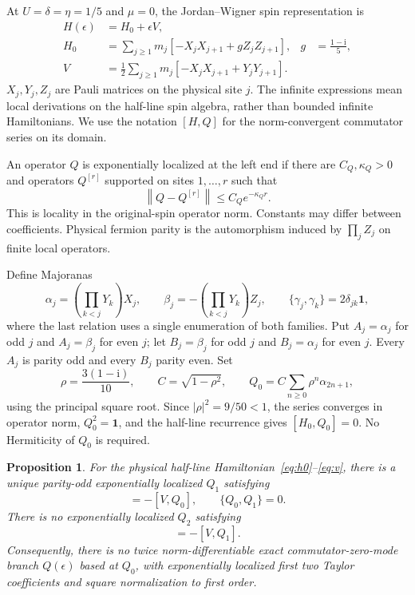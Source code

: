 \documentclass[11pt,a4paper]{article}
\newcommand{\ii}{\mathrm{i}}
\newcommand{\Id}{\mathbf{1}}
\newcommand{\norm}[1]{\left\lVert#1\right\rVert}
\newtheorem{proposition}{Proposition}
\begin{document}
At $U=\delta=\eta=1/5$ and $\mu=0$, the Jordan--Wigner spin representation is
\begin{align}
 H(\epsilon)&=H_0+\epsilon V,\label{eq:expansion}\\
 H_0&=\sum_{j\geq1}m_j[-X_jX_{j+1}+g Z_jZ_{j+1}],
 &g&=\frac{1-\ii}{5},\label{eq:h0}\\
 V&=\frac12\sum_{j\geq1}m_j[-X_jX_{j+1}+Y_jY_{j+1}].\label{eq:v}
\end{align}
$X_j,Y_j,Z_j$ are Pauli matrices on the physical site $j$. The infinite
expressions mean local derivations on the half-line spin algebra, rather
than bounded infinite Hamiltonians. We use the notation $[H,Q]$ for the
norm-convergent commutator series on its domain.

An operator $Q$ is exponentially localized at the left end if there are
$C_Q,\kappa_Q>0$ and operators $Q^{[r]}$ supported on sites $1,\ldots,r$
such that
\begin{equation}
 \norm{Q-Q^{[r]}}\leq C_Q e^{-\kappa_Q r}.\label{eq:locality}
\end{equation}
This is locality in the original-spin operator norm. Constants may differ
between coefficients. Physical fermion parity is the automorphism induced
by $\prod_j Z_j$ on finite local operators.

Define Majoranas
\begin{equation}
 \alpha_j=\left(\prod_{k<j}Y_k\right)X_j,
 \qquad \beta_j=-\left(\prod_{k<j}Y_k\right)Z_j,
 \qquad \{\gamma_j,\gamma_k\}=2\delta_{jk}\Id,
 \label{eq:majoranas}
\end{equation}
where the last relation uses a single enumeration of both families. Put
$A_j=\alpha_j$ for odd $j$ and $A_j=\beta_j$ for even $j$; let
$B_j=\beta_j$ for odd $j$ and $B_j=\alpha_j$ for even $j$.
Every $A_j$ is parity odd and every $B_j$ parity even. Set
\begin{equation}
 \rho=\frac{3(1-\ii)}{10},\qquad C=\sqrt{1-\rho^2},\qquad
 Q_0=C\sum_{n\geq0}\rho^n\alpha_{2n+1},\label{eq:q0}
\end{equation}
using the principal square root. Since $|\rho|^2=9/50<1$, the series
converges in operator norm, $Q_0^2=\Id$, and the half-line recurrence gives
$[H_0,Q_0]=0$. No Hermiticity of $Q_0$ is required.

\begin{proposition}\label{prop:main}
For the physical half-line Hamiltonian~\eqref{eq:h0}--\eqref{eq:v}, there is
a unique parity-odd exponentially localized $Q_1$ satisfying
\begin{equation}
 [H_0,Q_1]=-[V,Q_0],\qquad \{Q_0,Q_1\}=0.\label{eq:first}
\end{equation}
There is no exponentially localized $Q_2$ satisfying
\begin{equation}
 [H_0,Q_2]=-[V,Q_1].\label{eq:second}
\end{equation}
Consequently, there is no twice norm-differentiable exact commutator-zero-mode
branch $Q(\epsilon)$ based at $Q_0$, with exponentially localized first two
Taylor coefficients and square normalization to first order.
\end{proposition}
\end{document}
